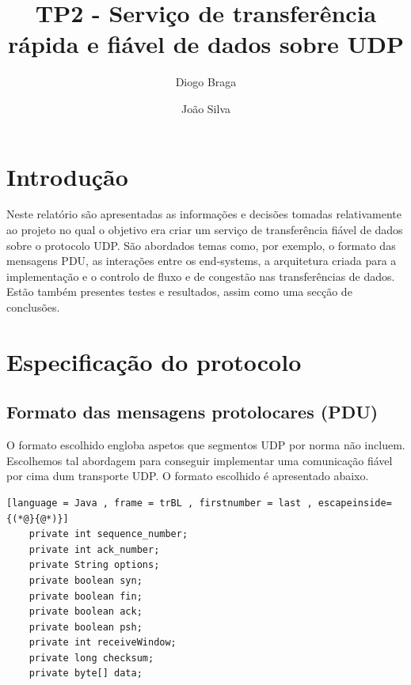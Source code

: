 \documentclass{llncs}
\begin{document}
\mainmatter
\title{TP2 - Serviço de transferência rápida e fiável de dados sobre UDP}


\author{Diogo Braga \and João Silva}



\date{}


\maketitle

\section{Introdução}

Neste relatório são apresentadas as informações e decisões tomadas relativamente ao projeto no qual o objetivo era criar um serviço de transferência fiável de dados sobre o protocolo UDP. São abordados temas como, por exemplo, o formato das mensagens PDU, as interações entre os end-systems, a arquitetura criada para a implementação e o controlo de fluxo e de congestão nas transferências de dados. Estão também presentes testes e resultados, assim como uma secção de conclusões.


\section{Especificação do protocolo}




\subsection{Formato das mensagens protolocares (PDU)}

O formato escolhido engloba aspetos que segmentos UDP por norma não incluem. Escolhemos tal abordagem para conseguir implementar uma comunicação fiável por cima dum transporte UDP. O formato escolhido é apresentado abaixo.

\begin{lstlisting}[language = Java , frame = trBL , firstnumber = last , escapeinside={(*@}{@*)}]
	private int sequence_number;
	private int ack_number;
	private String options;
	private boolean syn;
	private boolean fin;
	private boolean ack;
	private boolean psh;
	private int receiveWindow;
	private long checksum;
	private byte[] data;
\end{lstlisting}
\end{document}
